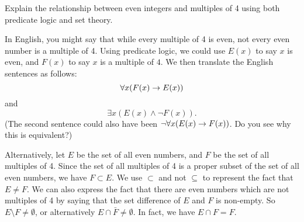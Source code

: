 \documentclass[12pt]{article}
\begin{document}
\begin{example}
Explain the relationship between even integers and multiples of 4 using both predicate logic and set theory.

\begin{solution}
 In English, you might say that while every multiple of 4 is even, not every even number is a multiple of 4.  Using predicate logic, we could use $E(x)$ to say $x$ is even, and $F(x)$ to say $x$ is a multiple of $4$.  We then translate the English sentences as follows:
 \[\forall x (F(x) \rightarrow E(x))\]
 and \[\exists x (E(x) \wedge \neg F(x)).\]
 (The second sentence could also have been $\neg \forall x (E(x) \rightarrow F(x))$.  Do you see why this is equivalent?)
 
 Alternatively, let $E$ be the set of all even numbers, and $F$ be the set of all multiples of 4.  Since the set of all multiples of 4 is a proper subset of the set of all even numbers, we have $F \subset E$.  We use $\subset$ and not $\subseteq$ to represent the fact that $E \ne F$.  We can also express the fact that there are even numbers which are not multiples of 4 by saying that the set difference of $E$ and $F$ is non-empty.  So $E \setminus F \ne \emptyset$, or alternatively $E \cap \bar F \ne \emptyset$.  In fact, we have $E \cap F = F$.
\end{solution}
\end{example}
\end{document}
